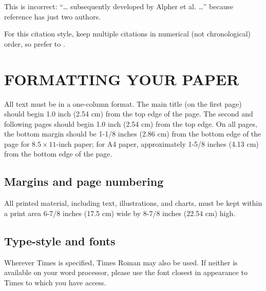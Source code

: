 This is incorrect: “… subsequently developed by Alpher et al. \cite{b2} …” because reference \cite{b2} has just two authors.

For this citation style, keep multiple citations in numerical (not chronological) order, so prefer \cite{b1, b2, b3} to \cite{b2, b1, b3}. 



%

\section{FORMATTING YOUR PAPER}

All text must be in a one-column format. The main title (on the first page) should begin 1.0 inch (2.54 cm) from the top edge of the page. The second and following pages should begin 1.0 inch (2.54 cm) from the top edge. On all pages, the bottom margin should be 1-1/8 inches (2.86 cm) from the bottom edge of the page for $8.5 \times 11$-inch paper; for A4 paper, approximately 1-5/8 inches (4.13 cm) from the bottom edge of the page.

\subsection{Margins and page numbering}

All printed material, including text, illustrations, and charts, must be kept within a print area 6-7/8 inches (17.5 cm) wide by 8-7/8 inches (22.54 cm) high.

\subsection{Type-style and fonts}

Wherever Times is specified, Times Roman may also be used. If neither is available on your word processor, please use the font closest in appearance to Times to which you have access.

